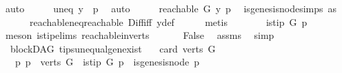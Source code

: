 \begin{isabellebody}
\ auto\isanewline
\ \ \isamarkupfalse%
\ \isamarkupfalse%
\ uneq{\isacharcolon}{\kern0pt}\ {\isachardoublequoteopen}y\ {\isasymnoteq}\ p{\isachardoublequoteclose}\ \isamarkupfalse%
\ auto\isanewline
\ \ \isamarkupfalse%
\ \isamarkupfalse%
\ {\isachardoublequoteopen}reachable{}\ G\ y\ p{\isachardoublequoteclose}\ \isamarkupfalse%
\ is{\isacharunderscore}{\kern0pt}genesis{\isacharunderscore}{\kern0pt}node{\isachardot}{\kern0pt}simps\ as\isanewline
\ \ \ \ \ \ reachable{\isacharunderscore}{\kern0pt}neq{\isacharunderscore}{\kern0pt}reachable{}\ Diff{\isacharunderscore}{\kern0pt}iff\ y{\isacharunderscore}{\kern0pt}def\isanewline
\ \ \ \ \isamarkupfalse%
\ metis\ \isanewline
\ \ \isamarkupfalse%
\ \isamarkupfalse%
\ {\isachardoublequoteopen}{\isasymnot}\ is{\isacharunderscore}{\kern0pt}tip\ G\ p{\isachardoublequoteclose}\isanewline
\ \ \ \ \isamarkupfalse%
\ {\isacharparenleft}{\kern0pt}meson\ is{\isacharunderscore}{\kern0pt}tip{\isachardot}{\kern0pt}elims{\isacharparenleft}{\kern0pt}{}{\isacharparenright}{\kern0pt}\ reachable{}{\isacharunderscore}{\kern0pt}in{\isacharunderscore}{\kern0pt}verts{\isacharparenleft}{\kern0pt}{}{\isacharparenright}{\kern0pt}{\isacharparenright}{\kern0pt}\ \isanewline
\ \ \isamarkupfalse%
\ \isamarkupfalse%
\ False\ \isamarkupfalse%
\ assms\ \isamarkupfalse%
\ simp\isanewline
{}\isamarkupfalse%
%
\endisatagproof
{\isafoldproof}%
%
\isadelimproof
\isanewline
%
\endisadelimproof
\isanewline
\isanewline
\isanewline
{}\isamarkupfalse%
\ {\isacharparenleft}{\kern0pt}\ blockDAG{\isacharparenright}{\kern0pt}\ tips{\isacharunderscore}{\kern0pt}unequal{\isacharunderscore}{\kern0pt}gen{\isacharunderscore}{\kern0pt}exist{\isacharcolon}{\kern0pt}\isanewline
\ \ \ {\isachardoublequoteopen}card{\isacharparenleft}{\kern0pt}\ verts\ G{\isacharparenright}{\kern0pt}\ {\isachargreater}{\kern0pt}\ {}{\isachardoublequoteclose}\isanewline
\ \ \ {\isachardoublequoteopen}{\isasymexists}p{\isachardot}{\kern0pt}\ p\ {\isasymin}\ verts\ G\ {\isasymand}\ is{\isacharunderscore}{\kern0pt}tip\ G\ p\ {\isasymand}\ {\isasymnot}is{\isacharunderscore}{\kern0pt}genesis{\isacharunderscore}{\kern0pt}node\ p\ {\isachardoublequoteclose}\isanewline
%
\isadelimproof
%
\endisadelimproof
%
\isatagproof

\end{isabellebody}
